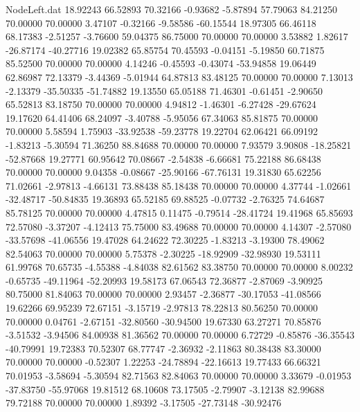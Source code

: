 \begin{filecontents}{NodeLeft.dat}
  18.92243   66.52893   70.32166    -0.93682   -5.87894   57.79063   84.21250   70.00000   70.00000    3.47107   -0.32166   -9.58586  -60.15544
  18.97305   66.46118   68.17383    -2.51257   -3.76600   59.04375   86.75000   70.00000   70.00000    3.53882    1.82617  -26.87174  -40.27716
  19.02382   65.85754   70.45593    -0.04151   -5.19850   60.71875   85.52500   70.00000   70.00000    4.14246   -0.45593   -0.43074  -53.94858
  19.06449   62.86987   72.13379    -3.44369   -5.01944   64.87813   83.48125   70.00000   70.00000    7.13013   -2.13379  -35.50335  -51.74882
  19.13550   65.05188   71.46301    -0.61451   -2.90650   65.52813   83.18750   70.00000   70.00000    4.94812   -1.46301   -6.27428  -29.67624
  19.17620   64.41406   68.24097    -3.40788   -5.95056   67.34063   85.81875   70.00000   70.00000    5.58594    1.75903  -33.92538  -59.23778
  19.22704   62.06421   66.09192    -1.83213   -5.30594   71.36250   88.84688   70.00000   70.00000    7.93579    3.90808  -18.25821  -52.87668
  19.27771   60.95642   70.08667    -2.54838   -6.66681   75.22188   86.68438   70.00000   70.00000    9.04358   -0.08667  -25.90166  -67.76131
  19.31830   65.62256   71.02661    -2.97813   -4.66131   73.88438   85.18438   70.00000   70.00000    4.37744   -1.02661  -32.48717  -50.84835
  19.36893   65.52185   69.88525    -0.07732   -2.76325   74.64687   85.78125   70.00000   70.00000    4.47815    0.11475   -0.79514  -28.41724
  19.41968   65.85693   72.57080    -3.37207   -4.12413   75.75000   83.49688   70.00000   70.00000    4.14307   -2.57080  -33.57698  -41.06556
  19.47028   64.24622   72.30225    -1.83213   -3.19300   78.49062   82.54063   70.00000   70.00000    5.75378   -2.30225  -18.92909  -32.98930
  19.53111   61.99768   70.65735    -4.55388   -4.84038   82.61562   83.38750   70.00000   70.00000    8.00232   -0.65735  -49.11964  -52.20993
  19.58173   67.06543   72.36877    -2.87069   -3.90925   80.75000   81.84063   70.00000   70.00000    2.93457   -2.36877  -30.17053  -41.08566
  19.62266   69.95239   72.67151    -3.15719   -2.97813   78.22813   80.56250   70.00000   70.00000    0.04761   -2.67151  -32.80560  -30.94500
  19.67330   63.27271   70.85876    -3.51532   -3.94506   84.00938   81.36562   70.00000   70.00000    6.72729   -0.85876  -36.35543  -40.79991
  19.72383   70.52307   68.77747    -2.36932   -2.11863   80.38438   83.30000   70.00000   70.00000   -0.52307    1.22253  -24.78894  -22.16613
  19.77433   66.66321   70.01953    -3.58694   -5.30594   82.71563   82.84063   70.00000   70.00000    3.33679   -0.01953  -37.83750  -55.97068
  19.81512   68.10608   73.17505    -2.79907   -3.12138   82.99688   79.72188   70.00000   70.00000    1.89392   -3.17505  -27.73148  -30.92476

\end{filecontents}
